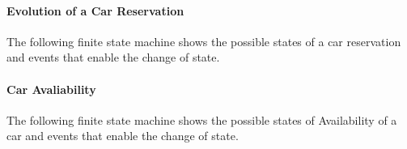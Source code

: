 \documentclass{article}
\begin{document}
			\paragraph{Evolution of a Car Reservation} The following finite state machine shows the possible states of a car reservation and events that enable the change of state.\\
			\noindent%
			\begin{minipage}{\linewidth}
			\end{minipage}	
			
			\vspace*{1cm}
		
			\paragraph{Car Avaliability} The following finite state machine shows the possible
			states of Availability of a car and events that enable the change of state.\\
			\noindent%
			\begin{minipage}{\linewidth}
			\end{minipage}	
			
\end{document}
